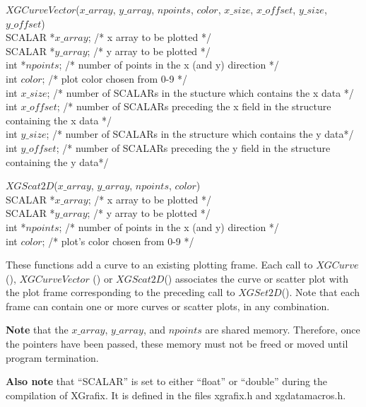 \begin{flushleft}
$XGCurveVector$($x\_array$, $y\_array$, $npoints$, $color$, $x\_size$,
$x\_offset$, $y\_size$, $y\_offset$) \\
SCALAR   *$x\_array$;    /* x array to be plotted                         */ \\
SCALAR   *$y\_array$;    /* y array to be plotted                         */ \\
int     *$npoints$;    /* number of points in the x (and y) direction    */ \\
int      $color$;      /* plot color chosen from 0-9 			*/ \\
int      $x\_size$;      /* number of SCALARs in the stucture which
contains the x data	*/ \\
int      $x\_offset$;      /* number of SCALARs preceding the x field
in the structure containing the x data		*/ \\
int      $y\_size$;      /* number of SCALARs in the structure which
	contains the y data*/ \\
int      $y\_offset$;      /* number of SCALARs preceding the y field
 in the structure containing the y data*/
\end{flushleft}

\begin{flushleft}
$XGScat2D$($x\_array$, $y\_array$, $npoints$, $color$) \\
SCALAR   *$x\_array$;    /* x array to be plotted                          */ \\
SCALAR   *$y\_array$;    /* y array to be plotted                          */ \\
int     *$npoints$;    /* number of points in the x (and y) direction    */ \\
int      $color$;      /* plot's color chosen from 0-9                   */
\end{flushleft}

These functions add a curve to an existing plotting frame.  Each call
to $XGCurve$(), $XGCurveVector$ ()  or $XGScat2D$() associates the curve or scatter plot
with the plot frame corresponding to the preceding call to $XGSet2D$().
Note that each frame can contain one or more curves or scatter plots, in
any combination.

{\bf Note} that the $x\_array$, $y\_array$, and $npoints$ are shared memory.
Therefore, once the pointers have been passed, these memory must not be freed
or moved until program termination. 

{\bf Also note} that ``SCALAR'' is set to either ``float'' or
``double'' during the compilation of XGrafix.  It is defined in the
files xgrafix.h and xgdatamacros.h.

